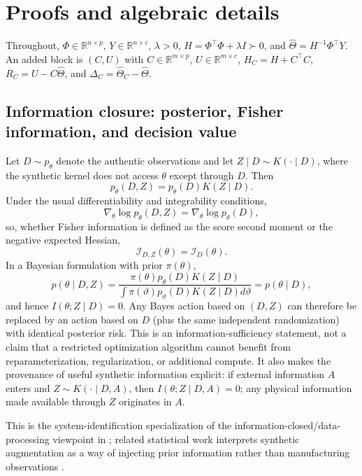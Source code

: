 \sloppy
\section{Proofs and algebraic details}\label{app:proofs}
Throughout, $\Phi\in\mathbb R^{n\times p}$, $Y\in\mathbb R^{n\times c}$, $\lambda>0$, $H=\Phi^\top\Phi+\lambda I\succ0$, and $\widehat\Theta=H^{-1}\Phi^\top Y$. An added block is $(C,U)$ with $C\in\mathbb R^{m\times p}$, $U\in\mathbb R^{m\times c}$, $H_C=H+C^\top C$, $R_C=U-C\widehat\Theta$, and $\Delta_C=\widehat\Theta_C-\widehat\Theta$.

\subsection{Information closure: posterior, Fisher information, and decision value}\label{app:closure-proof}
Let $D\sim p_\theta$ denote the authentic observations and let $Z\mid D\sim K(\cdot\mid D)$, where the synthetic kernel does not access $\theta$ except through $D$. Then
\[
p_\theta(D,Z)=p_\theta(D)K(Z\mid D).
\]
Under the usual differentiability and integrability conditions,
\[
\nabla_\theta\log p_\theta(D,Z)=\nabla_\theta\log p_\theta(D),
\]
so, whether Fisher information is defined as the score second moment or the negative expected Hessian,
\[
\mathcal I_{D,Z}(\theta)=\mathcal I_D(\theta).
\]
In a Bayesian formulation with prior $\pi(\theta)$,
\[
p(\theta\mid D,Z)=
\frac{\pi(\theta)p_\theta(D)K(Z\mid D)}{\int \pi(\vartheta)p_\vartheta(D)K(Z\mid D)d\vartheta}
=p(\theta\mid D),
\]
and hence $I(\theta;Z\mid D)=0$. Any Bayes action based on $(D,Z)$ can therefore be replaced by an action based on $D$ (plus the same independent randomization) with identical posterior risk. This is an information-sufficiency statement, not a claim that a restricted optimization algorithm cannot benefit from reparameterization, regularization, or additional compute. It also makes the provenance of useful synthetic information explicit: if external information $A$ enters and $Z\sim K(\cdot\mid D,A)$, then $I(\theta;Z\mid D,A)=0$; any physical information made available through $Z$ originates in $A$.

This is the system-identification specialization of the information-closed/data-processing viewpoint in \citet{li2026information}; related statistical work interprets synthetic augmentation as a way of injecting prior information rather than manufacturing observations \citep{dale2026synthetic}.

